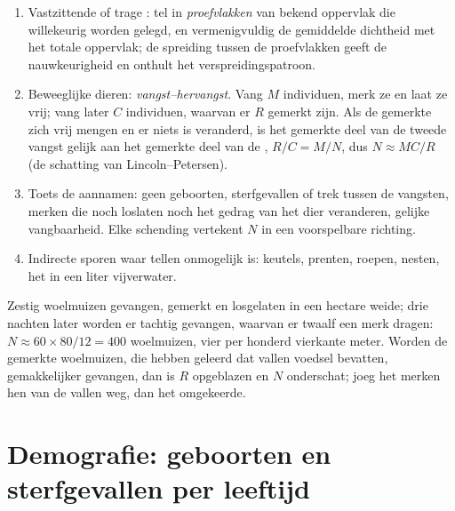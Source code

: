 \begin{method}\label{met:b1:populations:counting}
\begin{enumerate}
  \item Vastzittende of trage : tel in \emph{proefvlakken} van
        bekend oppervlak die willekeurig worden gelegd, en vermenigvuldig
        de gemiddelde dichtheid met het totale oppervlak; de spreiding
        tussen de proefvlakken geeft de nauwkeurigheid en onthult het
        verspreidingspatroon.
  \item Beweeglijke dieren: \emph{vangst--hervangst}. Vang $M$
        individuen, merk ze en laat ze vrij; vang later $C$ individuen,
        waarvan er $R$ gemerkt zijn. Als de gemerkte zich vrij mengen en
        er niets is veranderd, is het gemerkte deel van de tweede vangst
        gelijk aan het gemerkte deel van de , $R/C = M/N$, dus
        $N \approx MC/R$ (de schatting van Lincoln--Petersen).
  \item Toets de aannamen: geen geboorten, sterfgevallen of trek tussen
        de vangsten, merken die noch loslaten noch het gedrag van het
        dier veranderen, gelijke vangbaarheid. Elke schending vertekent
        $N$ in een voorspelbare richting.
  \item Indirecte sporen waar tellen onmogelijk is: keutels, prenten,
        roepen, nesten, het  in een liter vijverwater.
\end{enumerate}
\end{method}

\begin{example}\label{ex:b1:populations:voles}
Zestig woelmuizen gevangen, gemerkt en losgelaten in een hectare weide;
drie nachten later worden er tachtig gevangen, waarvan er twaalf een merk
dragen: $N \approx 60\times 80/12 = 400$ woelmuizen, vier per honderd
vierkante meter. Worden de gemerkte woelmuizen, die hebben geleerd dat
vallen voedsel bevatten, gemakkelijker gevangen, dan is $R$ opgeblazen en
$N$ onderschat; joeg het merken hen van de vallen weg, dan het omgekeerde.
\end{example}

\section{Demografie: geboorten en sterfgevallen per leeftijd}

